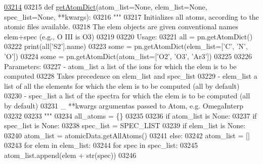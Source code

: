 \begin{DoxyCode}
\hypertarget{namespacepyneb_1_1core_1_1pynebcore_l03214}{}\hyperlink{namespacepyneb_1_1core_1_1pynebcore_a827f434ffd7a142d4ee91740b0174c1a}{03214} 
03215 \textcolor{keyword}{def }\hyperlink{namespacepyneb_1_1core_1_1pynebcore_a827f434ffd7a142d4ee91740b0174c1a}{getAtomDict}(atom\_list=None, elem\_list=None, spec\_list=None, **kwargs):
03216     \textcolor{stringliteral}{""" }
03217 \textcolor{stringliteral}{    Initializes all atoms, according to the atomic files available.}
03218 \textcolor{stringliteral}{    The elem objects are given conventional names elem+spec (e.g., O III is O3)}
03219 \textcolor{stringliteral}{}
03220 \textcolor{stringliteral}{    Usage:}
03221 \textcolor{stringliteral}{        all = pn.getAtomDict()}
03222 \textcolor{stringliteral}{        print(all['S2'].name)}
03223 \textcolor{stringliteral}{        some = pn.getAtomDict(elem\_list=['C', 'N', 'O'])}
03224 \textcolor{stringliteral}{        some = pn.getAtomDict(atom\_list=['O2', 'O3', 'Ar3'])}
03225 \textcolor{stringliteral}{    }
03226 \textcolor{stringliteral}{    Parameters:}
03227 \textcolor{stringliteral}{        - atom\_list     a list of the ions for which the elem is to be computed }
03228 \textcolor{stringliteral}{                        Takes precedence on elem\_list and spec\_list}
03229 \textcolor{stringliteral}{        - elem\_list     a list of all the elements for which the elem is to be computed (all by default)}
03230 \textcolor{stringliteral}{        - spec\_list     a list of the spectra for which the elem is to be computed (all by default)}
03231 \textcolor{stringliteral}{        \_ **kwargs      argumentas passed to Atom, e.g. OmegaInterp}
03232 \textcolor{stringliteral}{}
03233 \textcolor{stringliteral}{    """} 
03234     all\_atoms = \{\}
03235 
03236     \textcolor{keywordflow}{if} atom\_list \textcolor{keywordflow}{is} \textcolor{keywordtype}{None}:       
03237         \textcolor{keywordflow}{if} spec\_list \textcolor{keywordflow}{is} \textcolor{keywordtype}{None}:
03238             spec\_list = SPEC\_LIST
03239         \textcolor{keywordflow}{if} elem\_list \textcolor{keywordflow}{is} \textcolor{keywordtype}{None}:
03240             atom\_list = atomicData.getAllAtoms()
03241         \textcolor{keywordflow}{else}:
03242             atom\_list = []
03243             \textcolor{keywordflow}{for} elem \textcolor{keywordflow}{in} elem\_list:
03244                 \textcolor{keywordflow}{for} spec \textcolor{keywordflow}{in} spec\_list:
03245                     atom\_list.append(elem + str(spec)) 
03246 

\end{DoxyCode}
